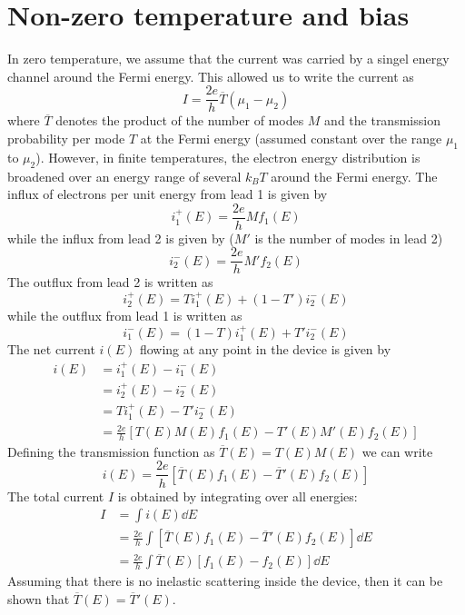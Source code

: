 \documentclass[11pt,a4paper]{book}
\theoremstyle{plain}
\theoremstyle{definition}
\theoremstyle{remark}
\begin{document}
\section{Non-zero temperature and bias}
In zero temperature, we assume that the current was carried by a singel energy channel around the Fermi energy. This allowed us to write the current as
\begin{equation}
    I = \frac{2 e}{h} \overline{T} (\mu_1 - \mu_2)
\end{equation}
where $\overline{T}$ denotes the product of the number of modes $M$ and the transmission probability per mode $T$ at the Fermi energy (assumed constant over the range $\mu_1$ to $\mu_2$). However, in finite temperatures, the electron energy distribution is broadened over an energy range of several $k_B T$ around the Fermi energy. The influx of electrons per unit energy from lead 1 is given by
\begin{equation}
    i_1^+(E) = \frac{2 e}{h} M f_1(E)
\end{equation}
while the influx from lead 2 is given by ($M'$ is the number of modes in lead 2)
\begin{equation}
    i_2^-(E) = \frac{2 e}{h} M' f_2(E)
\end{equation}
The outflux from lead 2 is written as 
\begin{equation}
    i_2^+(E) = T i_1^+(E) + (1-T') i_2^-(E)
\end{equation}
while the outflux from lead 1 is written as
\begin{equation}
    i_1^-(E) = (1-T) i_1^+(E) + T' i_2^-(E)
\end{equation}
The net current $i(E)$ flowing at any point in the device is given by
\begin{equation}
    \begin{aligned}
        i(E) 
        & = i_1^+(E) - i_1^-(E) \\
        & = i_2^+(E) - i_2^-(E) \\
        & = T i_1^+(E)-T'i_2^-(E) \\
        & = \frac{2 e}{h} \left[ T(E) M(E) f_1(E) - T'(E) M'(E) f_2(E) \right]
    \end{aligned}
\end{equation}
Defining the transmission function as $\overline{T}(E) = T(E) M(E)$ we can write
\begin{equation}
    i(E) = \frac{2 e}{h} \left[ \overline{T}(E) f_1(E) - \overline{T}'(E) f_2(E) \right]
\end{equation}
The total current $I$ is obtained by integrating over all energies:
\begin{equation}
    \begin{aligned}
        I
        & = \int i(E) \dd E \\
        & = \frac{2 e}{h} \int \left[ \overline{T}(E) f_1(E) - \overline{T}'(E) f_2(E) \right] \dd E \\
        & = \frac{2 e}{h} \int \overline{T}(E) \left[ f_1(E) - f_2(E) \right] \dd E
    \end{aligned}
\end{equation}
Assuming that there is no inelastic scattering inside the device, then it can be shown that $\overline{T}(E) = \overline{T}'(E)$.
\end{document}
